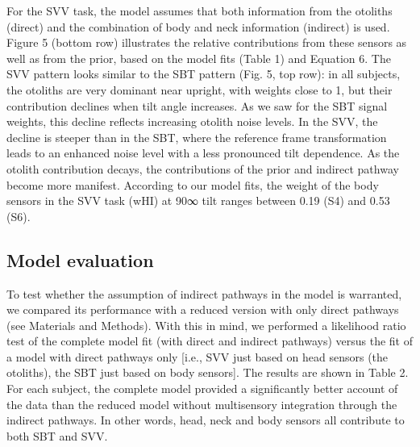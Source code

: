 For the SVV task, the model assumes that both information from the otoliths (direct) and the combination of body and neck information (indirect) is used. Figure 5 (bottom row) illustrates the relative contributions from these sensors as well as from the prior, based on the model fits (Table 1) and Equation 6. The SVV pattern looks similar to the SBT pattern (Fig. 5, top row): in all subjects, the otoliths are very dominant near upright, with weights close to 1, but their contribution declines when tilt angle increases. As we saw for the SBT signal weights, this decline reflects increasing otolith noise levels. In the SVV, the decline is steeper than in the SBT, where the reference frame transformation leads to an enhanced noise level with a less pronounced tilt dependence. As the otolith contribution decays, the contributions of the prior and indirect pathway become more manifest. According to our model fits, the weight of the body sensors in the SVV task (wHI) at 90∞ tilt ranges between 0.19 (S4) and 0.53 (S6). 

\subsection{Model evaluation}
 
To test whether the assumption of indirect pathways in the model is warranted, we compared its performance with a reduced version with only direct pathways (see Materials and Methods). With this in mind, we performed a likelihood ratio test of the complete model fit (with direct and indirect pathways) versus the fit of a model with direct pathways only [i.e., SVV just based on head sensors (the otoliths), the SBT just based on body sensors]. The results are shown in Table 2. For each subject, the complete model provided a significantly better account of the data than the reduced model without multisensory integration through the indirect pathways. In other words, head, neck and body sensors all contribute to both SBT and SVV. 

